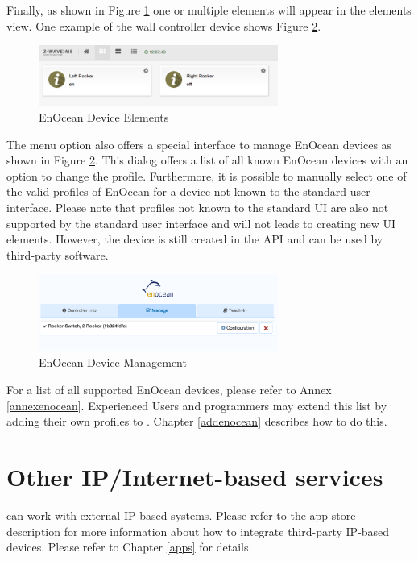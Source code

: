 Finally, as shown in Figure \ref{enocean5} one or multiple elements will appear in 
the elements view. One example of the wall controller device shows Figure \ref{enocean6}.

\begin{figure}
\begin{center}
\includegraphics[width=0.7\textwidth]{pngs/cap9/enocean5.png}
\caption{EnOcean Device Elements}
\label{enocean5}
\end{center}
\end{figure}

The menu option  also offers a special interface to manage EnOcean devices as 
shown in Figure \ref{enocean6}. This dialog offers a list of all known EnOcean devices 
with an option to change the profile.
Furthermore, it is possible to manually select one of the valid profiles of EnOcean for
 a device not known to the standard user interface. Please note that profiles not known 
 to the standard UI are also not supported by the standard user interface and will not 
 leads to creating new UI elements. However, the device is still created in the API 
 and can be used by third-party software.

\begin{figure}
\begin{center}
\includegraphics[width=0.7\textwidth]{pngs/cap9/enocean6.png}
\caption{EnOcean Device Management}
\label{enocean6}
\end{center}
\end{figure}

For a list of all supported EnOcean devices, please refer to Annex \ref{annexenocean}.
Experienced Users and programmers may extend this list by adding their own profiles to \zway.
Chapter \ref{addenocean} describes how to do this.


\section {Other IP/Internet-based services}

\zway can work with external IP-based systems. Please refer to the app store description 
for more information about how to integrate third-party IP-based devices. Please refer 
to Chapter \ref{apps} for details.

